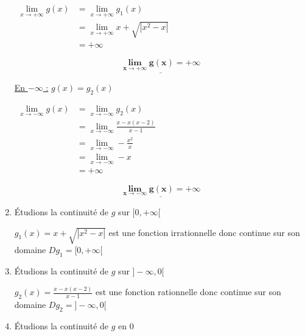 \documentclass[12pt,a4paper]{article}
\begin{document}
\begin{enumerate}
										\(
									\begin{aligned}
											\lim\limits_{x \to +\infty}g(x) &= \lim\limits_{x \to +\infty}g_{1}(x)\\
																											&= \lim\limits_{x \to +\infty}x + \sqrt{|x^2 - x|}\\
																											&=+\infty
									\end{aligned}
									\)    
 
										\begin{resultbox}
                        \[
                            \mathbf{ \underline{\lim\limits_{x \to +\infty}g(x) = +\infty} }
                        \]
                    \end{resultbox}   
    
    		\underline{En $-\infty$ :} $g(x) = g_{2}(x)$

										\(
									\begin{aligned}
											\lim\limits_{x \to -\infty}g(x) &= \lim\limits_{x \to -\infty}g_{2}(x)\\
																											&= \lim\limits_{x \to -\infty}\frac{x - x(x-2)}{x - 1}\\
																											&=\lim\limits_{x \to -\infty}-\frac{x^{2}}{x}\\
																											&=\lim\limits_{x \to -\infty}-x\\
																											&=+\infty
									\end{aligned}
									\)    

											\begin{resultbox}
                        \[
                            \mathbf{ \underline{\lim\limits_{x \to -\infty}g(x) = +\infty} }
                        \]
                    \end{resultbox}
    \item Étudions la continuité de \( g \) sur \( [0, +\infty[ \)    
    
\( g_{1}(x) = x + \sqrt{|x^2 - x|} \) est une fonction irrationnelle donc continue sur son domaine $Dg_{1} = [0,+\infty[$
                    
    \item Étudions la continuité de \( g \) sur \( ]-\infty, 0[ \)

\( g_{2}(x) = \frac{x - x(x-2)}{x - 1} \) est une fonction rationnelle donc continue sur son domaine $Dg_{2} = ]-\infty, 0[$

    \item Étudions  la continuité de \( g \) en \( 0 \)


\end{enumerate}
\end{document}
